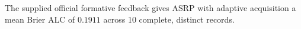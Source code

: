 The supplied official formative feedback gives ASRP with adaptive acquisition a mean Brier ALC of $0.1911$ across 10 complete, distinct records.
